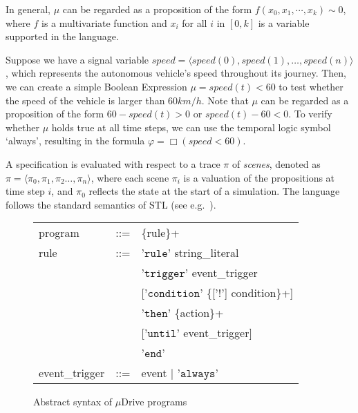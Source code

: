 In general, $\mu$ can be regarded as a proposition of the form $f(x_0,x_1,   \cdots, x_k) \sim 0$, where $f$ is a multivariate function and $x_i$ for all $i$ in $[0,k]$ is a variable supported in the language.
\begin{example}
    Suppose we have a signal variable $speed = \langle speed(0),   speed(1), \dots, speed(n) \rangle$, which represents the autonomous vehicle's speed throughout its journey.
    Then, we can create a simple Boolean Expression $\mu = speed(t) < 60$ to test whether the speed of the vehicle is larger than $60km/h$. 
    Note that $\mu$ can be regarded as a proposition of the form $60 - speed(t) > 0$ or $speed(t) - 60 < 0$.
    To verify whether $\mu$ holds true at all time steps, we can use the temporal logic symbol `always', resulting in the formula $\varphi = \Box (speed < 60)$.
\end{example}


A specification is evaluated with respect to a trace $\pi$ of \emph{scenes}, denoted as $\pi=\langle \pi_0, \pi_1, \pi_2 \ldots, \pi_n \rangle$, where each scene $\pi_i$ is a valuation of the propositions at time step $i$, and $\pi_0$ reflects the state at the start of a simulation.
The language follows the standard semantics of STL (see e.g.~\cite{maler2004monitoring}).






\begin{figure}[t]
\begin{center}
\renewcommand{\arraystretch}{1.2}\footnotesize
\begin{tabular}{lcl}
program & ::= & \{rule\}+~ \\
rule & ::= &  '$\mathtt{rule}$' string\_literal \\
  && '$\mathtt{trigger}$' event\_trigger \\
  && ['$\mathtt{condition}$' \{['$\mathtt{!}$'] condition\}+] \\
  && '$\mathtt{then}$' \{action\}+~ \\
  && ['$\mathtt{until}$' event\_trigger] \\
  && '$\mathtt{end}$' \\
event\_trigger & ::= & event $\mid$ '$\mathtt{always}$' \\
\end{tabular}
\end{center}
\vspace{-0.2cm}
	\caption{Abstract syntax of $\mu$Drive programs}
	\label{fig:abstract_syntax}
 \vspace{-0.5cm}
\end{figure}

